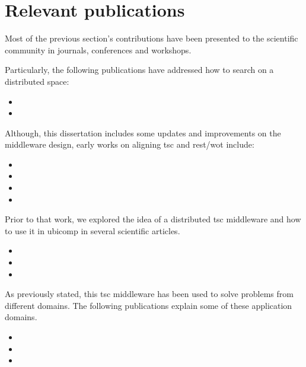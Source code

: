 \section{Relevant publications}


Most of the previous section's contributions have been presented to the scientific community in journals, conferences and workshops.

\begin{sloppypar}

Particularly, the following publications have addressed how to search on a distributed space:
\begin{itemize}
 \item[] 
 \item[] 
\end{itemize}


Although, this dissertation includes some updates and improvements on the middleware design, early works on aligning \ac{tsc} and \ac{rest}/\ac{wot} include:
\begin{itemize}
 \item[] 
 \item[] 
 \item[] 
 \item[] 
\end{itemize}


Prior to that work, we explored the idea of a distributed \ac{tsc} middleware and how to use it in \ac{ubicomp} in several scientific articles. %
\begin{itemize}
 \item[] 
 \item[] 
 \item[] 
\end{itemize}


As previously stated, this \ac{tsc} middleware has been used to solve problems from different domains.
The following publications explain some of these application domains.
\begin{itemize}
 \item[] 
 \item[] 
 \item[] 
\end{itemize}



\end{sloppypar}
